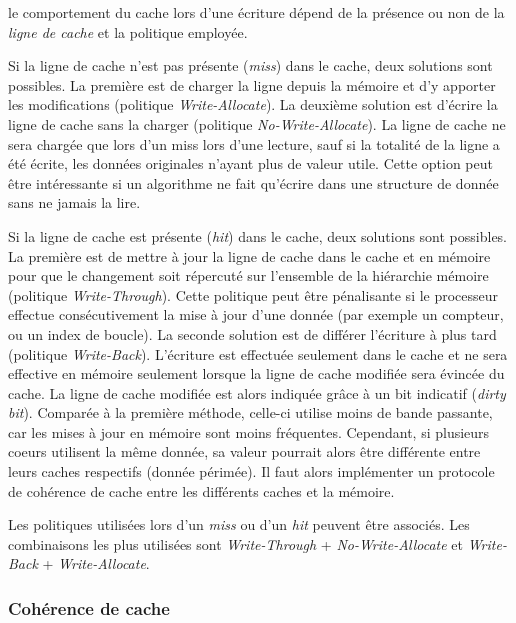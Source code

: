            le comportement du cache lors d'une écriture dépend de la présence ou non de la \textit{ligne de cache} et la politique employée.
        
        Si la ligne de cache n'est pas présente (\textit{miss}) dans le cache, deux solutions sont possibles. La première est de charger la ligne depuis la mémoire et d'y apporter les modifications (politique \textit{Write-Allocate}). La deuxième solution est d'écrire la ligne de cache sans la charger (politique \textit{No-Write-Allocate}). La ligne de cache ne sera chargée que lors d'un miss lors d'une lecture, sauf si la totalité de la ligne a été écrite, les données originales n'ayant plus de valeur utile. Cette option peut être intéressante si un algorithme ne fait qu'écrire dans une structure de donnée sans ne jamais la lire.
        
        Si la ligne de cache est présente (\textit{hit}) dans le cache, deux solutions sont possibles. La première est de mettre à jour la ligne de cache dans le cache et en mémoire pour que le changement soit répercuté sur l'ensemble de la hiérarchie mémoire (politique \textit{Write-Through}). Cette politique peut être pénalisante si le processeur effectue consécutivement la mise à jour d'une donnée (par exemple un compteur, ou un index de boucle).  La seconde solution est de différer l'écriture à plus tard (politique \textit{Write-Back}). L'écriture est effectuée seulement dans le cache et ne sera effective en mémoire seulement lorsque la ligne de cache modifiée sera évincée du cache. La ligne de cache modifiée est alors indiquée grâce à un bit indicatif (\textit{dirty bit}). Comparée à la première méthode, celle-ci utilise moins de bande passante, car les mises à jour en mémoire sont moins fréquentes. Cependant, si plusieurs coeurs utilisent la même donnée, sa valeur pourrait alors être différente entre leurs caches respectifs (donnée périmée). Il faut alors implémenter un protocole de cohérence de cache entre les différents caches et la mémoire.
        
        Les politiques utilisées lors d'un \textit{miss} ou d'un \textit{hit} peuvent être associés. Les combinaisons les plus utilisées sont \textit{Write-Through} + \textit{No-Write-Allocate} et \textit{Write-Back} + \textit{Write-Allocate}.
        
        
        


    
    \subsubsection{Cohérence de cache} \label{sec:cache_coherence}
        
